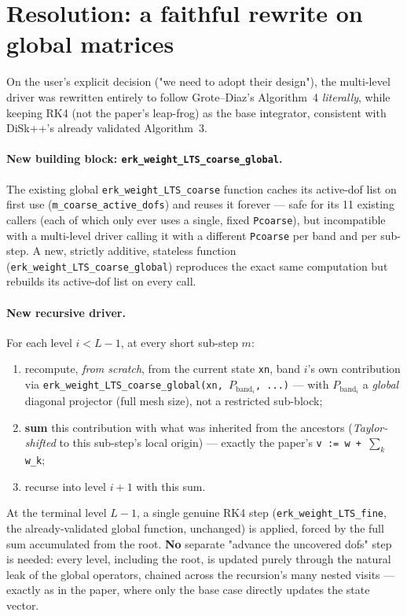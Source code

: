 \documentclass[11pt]{article}
\newcommand{\code}[1]{\texttt{#1}}
\begin{document}
\section{Resolution: a faithful rewrite on global matrices}
\label{sec:globalfix}

On the user's explicit decision ("we need to adopt their design"), the
multi-level driver was rewritten entirely to follow Grote--Diaz's
Algorithm~4 \emph{literally}, while keeping RK4 (not the paper's
leap-frog) as the base integrator, consistent with DiSk++'s already
validated Algorithm~3.

\paragraph{New building block: \code{erk\_weight\_LTS\_coarse\_global}.}
The existing global \code{erk\_weight\_LTS\_coarse} function caches its
active-dof list on first use (\code{m\_coarse\_active\_dofs}) and reuses
it forever --- safe for its 11 existing callers (each of which only
ever uses a single, fixed \code{Pcoarse}), but incompatible with a
multi-level driver calling it with a different \code{Pcoarse} per band
and per sub-step. A new, strictly additive, stateless function
(\code{erk\_weight\_LTS\_coarse\_global}) reproduces the exact same
computation but rebuilds its active-dof list on every call.

\paragraph{New recursive driver.} For each level $i<L-1$, at every
short sub-step $m$:
\begin{enumerate}
  \item recompute, \emph{from scratch}, from the current state
  \code{xn}, band $i$'s own contribution via
  \code{erk\_weight\_LTS\_coarse\_global(xn, $P_{\text{band}_i}$,
  ...)} --- with $P_{\text{band}_i}$ a \emph{global} diagonal
  projector (full mesh size), not a restricted sub-block;
  \item \textbf{sum} this contribution with what was inherited from
  the ancestors (\emph{Taylor-shifted} to this sub-step's local
  origin) --- exactly the paper's \code{v := w + $\sum_k$ w\_k};
  \item recurse into level $i+1$ with this sum.
\end{enumerate}
At the terminal level $L-1$, a single genuine RK4 step
(\code{erk\_weight\_LTS\_fine}, the already-validated global function,
unchanged) is applied, forced by the full sum accumulated from the
root. \textbf{No} separate "advance the uncovered dofs" step is
needed: every level, including the root, is updated purely through the
natural leak of the global operators, chained across the recursion's
many nested visits --- exactly as in the paper, where only the base
case directly updates the state vector.
\end{document}
